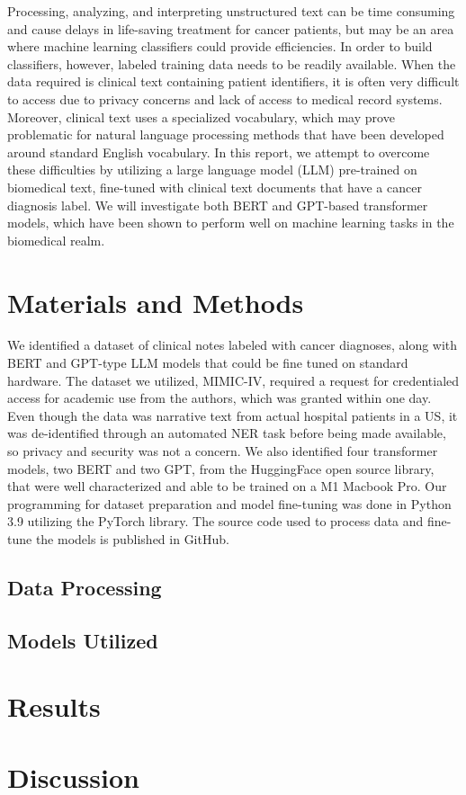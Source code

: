 \documentclass[manuscript,screen,review,nonacm]{acmart}
\begin{document}
	Processing, analyzing, and interpreting unstructured text can be time consuming and cause delays in life-saving treatment for cancer patients, but may be an area where machine learning classifiers could provide efficiencies. In order to build classifiers, however, labeled training data needs to be readily available. When the data required is clinical text containing patient identifiers, it is often very difficult to access due to privacy concerns and lack of access to medical record systems. Moreover, clinical text uses a specialized vocabulary, which may prove problematic for natural language processing methods that have been developed around standard English vocabulary. In this report, we attempt to overcome these difficulties by utilizing a large language model (LLM) pre-trained on biomedical text, fine-tuned with clinical text documents that have a cancer diagnosis label. We will investigate both BERT\cite{devlin2018bert} and GPT\cite{radford2018improving}-based transformer\cite{vaswani2017attention} models, which have been shown to perform well on machine learning tasks in the biomedical realm\cite{wada2020pre}\cite{bbac409}.

\section{Materials and Methods}
We identified a dataset of clinical notes labeled with cancer diagnoses, along with BERT and GPT-type LLM models that could be fine tuned on standard hardware. The dataset we utilized, MIMIC-IV\cite{johnson2022mimic}, required a request for credentialed access for academic use from the authors, which was granted within one day. Even though the data was narrative text from actual hospital patients in a US, it was de-identified through an automated NER task\cite{johnson2020deidentification} before being made available, so privacy and security was not a concern. We also identified four transformer models, two BERT and two GPT, from the HuggingFace open source library, that were well characterized and able to be trained on a M1 Macbook Pro. Our programming for dataset preparation and model fine-tuning was done in Python 3.9 utilizing the PyTorch library\cite{paszke2019pytorch}. The source code used to process data and fine-tune the models is published in GitHub\cite{cs685}.

\subsection{Data Processing}

\subsection{Models Utilized}

\section{Results}

\section{Discussion}




\end{document}
